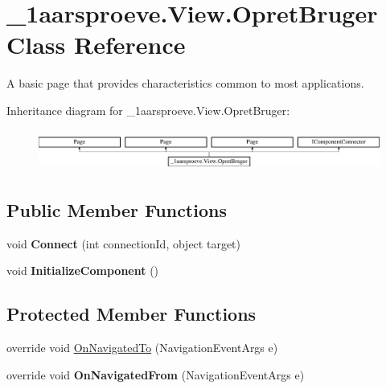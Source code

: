 \hypertarget{class__1aarsproeve_1_1_view_1_1_opret_bruger}{}\section{\+\_\+1aarsproeve.\+View.\+Opret\+Bruger Class Reference}
\label{class__1aarsproeve_1_1_view_1_1_opret_bruger}


A basic page that provides characteristics common to most applications.  


Inheritance diagram for \+\_\+1aarsproeve.\+View.\+Opret\+Bruger\+:\begin{figure}[H]
\begin{center}
\leavevmode
\includegraphics[height=1.359223cm]{class__1aarsproeve_1_1_view_1_1_opret_bruger}
\end{center}
\end{figure}
\subsection*{Public Member Functions}
\begin{DoxyCompactItemize}
\item 
\hypertarget{class__1aarsproeve_1_1_view_1_1_opret_bruger_a5e2f9fe203bec8aac1a9c705882502bd}{}void {\bfseries Connect} (int connection\+Id, object target)\label{class__1aarsproeve_1_1_view_1_1_opret_bruger_a5e2f9fe203bec8aac1a9c705882502bd}

\item 
\hypertarget{class__1aarsproeve_1_1_view_1_1_opret_bruger_a9d666a044c7981bc5099a366090dc726}{}void {\bfseries Initialize\+Component} ()\label{class__1aarsproeve_1_1_view_1_1_opret_bruger_a9d666a044c7981bc5099a366090dc726}

\end{DoxyCompactItemize}
\subsection*{Protected Member Functions}
\begin{DoxyCompactItemize}
\item 
override void \hyperlink{class__1aarsproeve_1_1_view_1_1_opret_bruger_a6c9f156568cc57390a59e547e497a65d}{On\+Navigated\+To} (Navigation\+Event\+Args e)
\item 
\hypertarget{class__1aarsproeve_1_1_view_1_1_opret_bruger_aba5e6a795635d072f688a7f378183b09}{}override void {\bfseries On\+Navigated\+From} (Navigation\+Event\+Args e)\label{class__1aarsproeve_1_1_view_1_1_opret_bruger_aba5e6a795635d072f688a7f378183b09}

\end{DoxyCompactItemize}
